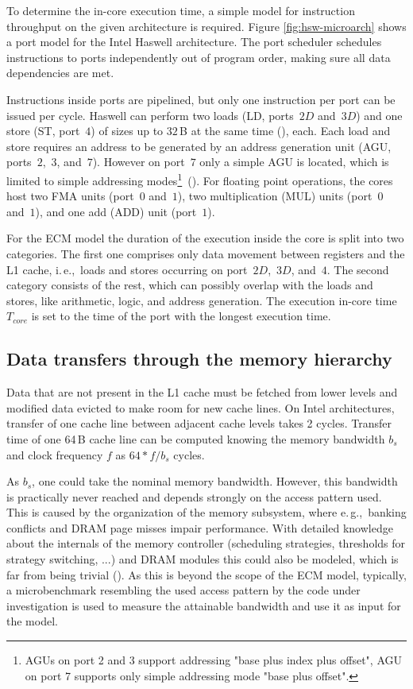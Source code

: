To determine the in-core execution time, a simple model for instruction throughput on the given architecture is required. Figure \ref{fig:hsw-microarch} shows a port model for the Intel Haswell architecture. The port scheduler schedules instructions to ports independently out of program order, making sure all data dependencies are met.

Instructions inside ports are pipelined, but only one instruction per port can
be issued per cycle.
Haswell can perform two loads (LD, ports~$2D$ and~$3D$) and one store (ST,
port~$4$) of sizes up to $32$\,B at the same time (\cite{intel-orm-2016}), each.
Each load and store requires an address to be generated by an address
generation unit (AGU, ports~$2$,~$3$, and~$7$).
However on port~$7$ only a simple AGU is located, which is limited to simple
addressing modes\footnote{AGUs on port 2 and 3 support addressing "base plus index plus offset", AGU on port 7 supports only simple addressing mode "base plus offset".}~(\cite{intel-orm-2016,hofmann-2016-hsw}).
%
For floating point operations, the cores host two 
FMA units (port~$0$ and~$1$), two multiplication (MUL) units (port~$0$
and~$1$), and one add (ADD) unit (port~$1$).

For the ECM model the duration of the execution inside the core is split into
two categories.
The first one comprises only data movement between registers and the L1 cache,
i.\,e.,\ loads and stores occurring on port~$2D$,~$3D$, and~$4$.
The second category consists of the rest, which can possibly overlap with the
loads and stores, like arithmetic, logic, and address generation.
The execution in-core time $T_{core}$ is set to the time of the port with the longest execution time.

\subsection*{Data transfers through the memory hierarchy}

Data that are not present in the L1 cache must be fetched from lower levels and modified data evicted to make room for new cache lines.
On Intel architectures, transfer of one cache line between adjacent cache levels takes 2 cycles.
Transfer time of one 64\,B cache line can be computed knowing the memory bandwidth $b_s$ and clock frequency $f$ as $64*f/b_s$ cycles.

As $b_s$, one could take the nominal memory bandwidth.
However, this bandwidth is practically never reached and depends strongly on the
access pattern used.
This is caused by the organization of the memory subsystem, where e.\,g.,\ banking
conflicts and DRAM page misses impair performance.
With detailed knowledge about the internals of the memory controller
(scheduling strategies, thresholds for strategy switching, ...) and DRAM modules
this could also be modeled, which is far from being trivial (\cite{jacob-2007}).
As this is beyond the scope of the ECM model, typically, a microbenchmark
resembling the used access pattern by the code under investigation is used
to measure the attainable bandwidth and use it as input for the model.

